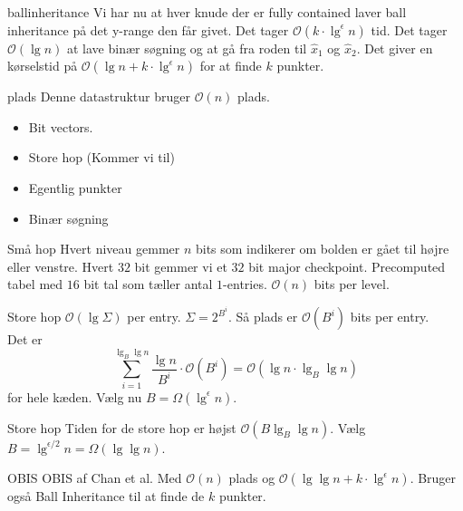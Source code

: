 \documentclass[pdf]{beamer}
\begin{document}
\begin{frame}{ballinheritance}
  Vi har nu at hver knude der er fully contained laver ball inheritance på det y-range den får givet. Det tager $\mathcal{O}(k\cdot\lg^\epsilon n)$ tid. Det tager $\mathcal{O}(\lg n)$ at lave binær søgning og at gå fra roden til $\hat{x}_1$ og $\hat{x}_2$.
  \pause
  Det giver en kørselstid på $\mathcal{O}(\lg n + k\cdot\lg^\epsilon n)$ for at finde $k$ punkter.
\end{frame}

\begin{frame}{plads}
  Denne datastruktur bruger $\mathcal{O}(n)$ plads.
  \begin{itemize}
    \item Bit vectors.
      \pause
    \item Store hop (Kommer vi til)
      \pause
    \item Egentlig punkter
      \pause
    \item Binær søgning
  \end{itemize}
\end{frame}

\begin{frame}{Små hop}
  Hvert niveau gemmer $n$ bits som indikerer om bolden er gået til højre eller venstre. Hvert $32$ bit gemmer vi et $32$ bit major checkpoint. Precomputed tabel med $16$ bit tal som tæller antal $1$-entries. $\mathcal{O}(n)$ bits per level.
\end{frame}

\begin{frame}{Store hop}
  $\mathcal{O}(\lg \Sigma)$ per entry. $\Sigma = 2^{B^i}$. Så plads er $\mathcal{O}(B^i)$ bits per entry.\\

  Det er $$\sum_{i=1}^{\lg_B \lg n} \frac{\lg n}{B^i}\cdot\mathcal{O}(B^i) = \mathcal{O}(\lg n \cdot \lg_B \lg n)$$ for hele kæden. Vælg nu $B =  \Omega(\lg^\epsilon n)$.
\end{frame}

\begin{frame}{Store hop}
  Tiden for de store hop er højst $\mathcal{O}(B \lg_B \lg n)$. Vælg $B = \lg^{\epsilon / 2} n = \Omega(\lg \lg n)$.
\end{frame}

\begin{frame}{OBIS}
  OBIS af Chan et al. Med $\mathcal{O}(n)$ plads og $\mathcal{O}(\lg \lg n + k\cdot\lg^\epsilon n)$. Bruger også Ball Inheritance til at finde de $k$ punkter.
\end{frame}
\end{document}
